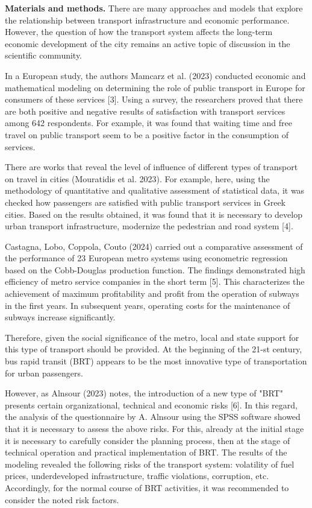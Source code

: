 {\bfseries Materials and methods.} There are many approaches and models
that explore the relationship between transport infrastructure and
economic performance. However, the question of how the transport system
affects the long-term economic development of the city remains an active
topic of discussion in the scientific community.

In a European study, the authors Mamcarz et al. (2023) conducted
economic and mathematical modeling on determining the role of public
transport in Europe for consumers of these services {[}3{]}. Using a
survey, the researchers proved that there are both positive and negative
results of satisfaction with transport services among 642 respondents.
For example, it was found that waiting time and free travel on public
transport seem to be a positive factor in the consumption of services.

There are works that reveal the level of influence of different types of
transport on travel in cities (Mouratidis et al. 2023). For example,
here, using the methodology of quantitative and qualitative assessment
of statistical data, it was checked how passengers are satisfied with
public transport services in Greek cities. Based on the results
obtained, it was found that it is necessary to develop urban transport
infrastructure, modernize the pedestrian and road system {[}4{]}.

Castagna, Lobo, Coppola, Couto (2024) carried out a comparative
assessment of the performance of 23 European metro systems using
econometric regression based on the Cobb-Douglas production function.
The findings demonstrated high efficiency of metro service companies in
the short term {[}5{]}. This characterizes the achievement of maximum
profitability and profit from the operation of subways in the first
years. In subsequent years, operating costs for the maintenance of
subways increase significantly.

Therefore, given the social significance of the metro, local and state
support for this type of transport should be provided. At the beginning
of the 21-st century, bus rapid transit (BRT) appears to be the most
innovative type of transportation for urban passengers.

However, as Alnsour (2023) notes, the introduction of a new type of
"BRT" presents certain organizational, technical and economic risks
{[}6{]}. In this regard, the analysis of the questionnaire by A. Alnsour
using the SPSS software showed that it is necessary to assess the above
risks. For this, already at the initial stage it is necessary to
carefully consider the planning process, then at the stage of technical
operation and practical implementation of BRT. The results of the
modeling revealed the following risks of the transport system:
volatility of fuel prices, underdeveloped infrastructure, traffic
violations, corruption, etc. Accordingly, for the normal course of BRT
activities, it was recommended to consider the noted risk factors.

